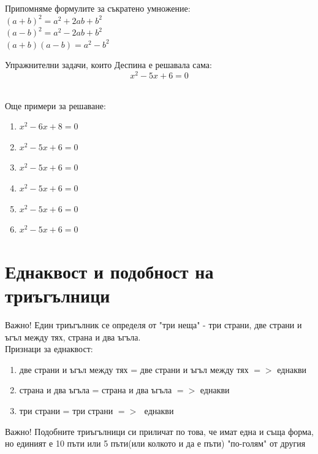 \documentclass{article}
\begin{document}
	
	Припомняме формулите за съкратено умножение:\\
	 $(a+b)^2 = a^2 + 2ab + b^2$ \\
	 $(a-b)^2 = a^2 - 2ab + b^2$ \\
	 $(a+b)(a-b) = a^2 - b^2 $
	 
	 \vspace{1cm}
	 
	 
	
	Упражнителни задачи, които Деспина е решавала сама: \\
	
		$$x^2 - 5x + 6 = 0$$  \\
		
		
		\vspace{3cm}
		
		Още примери за решаване: \\
		\begin{enumerate}
			\item $x^2 - 6x + 8 = 0$
			\item $x^2 - 5x + 6 = 0$
			\item $x^2 - 5x + 6 = 0$
			\item $x^2 - 5x + 6 = 0$
			\item $x^2 - 5x + 6 = 0$
			\item $x^2 - 5x + 6 = 0$
		\end{enumerate}

		
		
		\newpage
	\section{Еднаквост и подобност на триъгълници}	
	
	Важно! Един триъгълник се определя от "три неща" - 
	три страни, две страни и ъгъл между тях, страна и два ъгъла. \\
	
	
	Признаци за еднаквост:
	\begin{enumerate}
		\item две страни и ъгъл между тях = две страни и ъгъл между тях $=>$  еднакви
		\item страна и два ъгъла = страна и два ъгъла $=>$  еднакви
		\item три страни = три страни $=>$ $ $ еднакви
	\end{enumerate}

	\vspace{1cm}
	
	
	Важно! Подобните триъгълници си приличат по това, че имат една и съща форма, но единият е 10 пъти или 5 пъти(или колкото и да е пъти) "по-голям" от другия \\
	
\end{document}

